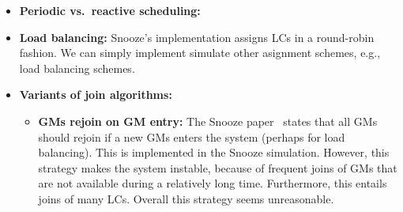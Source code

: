 \begin{itemize}
  \item \textbf{Periodic vs.\ reactive scheduling:} 
  \item \textbf{Load balancing:} Snooze's implementation assigns LCs
    in a round-robin fashion. We can simply implement simulate other
    asignment schemes, e.g., load balancing schemes.
  \item \textbf{Variants of join algorithms:}
    \begin{itemize}
      \item \textbf{GMs rejoin on GM entry:} The Snooze
        paper~\cite{feller:ccgrid12} states that all GMs should rejoin if a new
        GMs enters the system (perhaps for load balancing). This is
        implemented in the Snooze simulation. However, this strategy
        makes the system instable, because of frequent joins of GMs
        that are not available during a relatively long
        time. Furthermore, this entails joins of many LCs. Overall
        this strategy seems unreasonable.
    \end{itemize}
\end{itemize}




